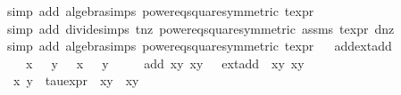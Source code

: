 \begin{isabellebody}
{\isacharparenleft}simp\ add{\isacharcolon}\ algebra{\isacharunderscore}simps\ power{}{\isacharunderscore}eq{\isacharunderscore}square{\isacharbrackleft}symmetric{\isacharbrackright}\ t{\isacharunderscore}expr{\isacharparenleft}{}{\isacharparenright}{\isacharparenright}\ \isanewline
\ \ \isamarkupfalse%
{\isacharparenleft}simp\ add{\isacharcolon}\ divide{\isacharunderscore}simps\ t{\isacharunderscore}nz\ power{}{\isacharunderscore}eq{\isacharunderscore}square{\isacharbrackleft}symmetric{\isacharbrackright}\ assms\ t{\isacharunderscore}expr{\isacharparenleft}{}{\isacharparenright}\ d{\isacharunderscore}nz{\isacharparenright}\isanewline
\ \ \isamarkupfalse%
{\isacharparenleft}simp\ add{\isacharcolon}\ algebra{\isacharunderscore}simps\ power{}{\isacharunderscore}eq{\isacharunderscore}square{\isacharbrackleft}symmetric{\isacharbrackright}\ t{\isacharunderscore}expr{\isacharparenleft}{}{\isacharparenright}{\isacharparenright}%
\endisatagproof
{\isafoldproof}%
%
\isadelimproof
\ \isanewline
%
\endisadelimproof
\isanewline
{}\isamarkupfalse%
\ add{\isacharunderscore}ext{\isacharunderscore}add{\isacharunderscore}{}{\isacharcolon}\isanewline
\ \ \ {\isachardoublequoteopen}x{}\ {\isasymnoteq}\ {}{\isachardoublequoteclose}\ {\isachardoublequoteopen}y{}\ {\isasymnoteq}\ {}{\isachardoublequoteclose}\ {\isachardoublequoteopen}x{}\ {\isasymnoteq}\ {}{\isachardoublequoteclose}\ {\isachardoublequoteopen}y{}\ {\isasymnoteq}\ {}{\isachardoublequoteclose}\isanewline
\ \ \ {\isachardoublequoteopen}add\ {\isacharparenleft}x{}{\isacharcomma}y{}{\isacharparenright}\ {\isacharparenleft}x{}{\isacharcomma}y{}{\isacharparenright}\ {\isacharequal}\ {\isasymtau}\ {\isacharparenleft}ext{\isacharunderscore}add\ {\isacharparenleft}{\isasymtau}\ {\isacharparenleft}x{}{\isacharcomma}y{}{\isacharparenright}{\isacharparenright}\ {\isacharparenleft}x{}{\isacharcomma}y{}{\isacharparenright}{\isacharparenright}{\isachardoublequoteclose}\isanewline
%
\isadelimproof
%
\endisadelimproof
%
\isatagproof
{}\isamarkupfalse%
\ {\isacharminus}\isanewline
\ \ \isamarkupfalse%
\ x{}{\isacharprime}\ y{}{\isacharprime}\ \ tau{\isacharunderscore}expr{\isacharcolon}\ {\isachardoublequoteopen}{\isasymtau}\ {\isacharparenleft}x{}{\isacharcomma}y{}{\isacharparenright}\ {\isacharequal}\ {\isacharparenleft}x{}{\isacharprime}{\isacharcomma}y{}{\isacharprime}{\isacharparenright}{\isachardoublequoteclose}\ \isamarkupfalse%

\end{isabellebody}
